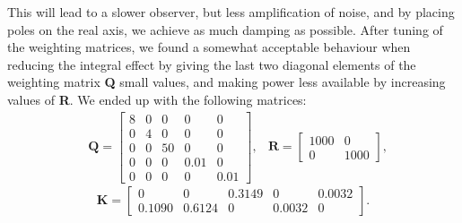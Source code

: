 This will lead to a slower observer, but less amplification of noise, and by placing poles on the real axis, we achieve as much damping as possible. After tuning of the weighting matrices, we found a somewhat acceptable behaviour when reducing the integral effect by giving the last two diagonal elements of the weighting matrix \textbf{Q} small values, and making power less available by increasing values of \textbf{R}. We ended up with the following matrices:
\begin{align}\nonumber
&\mathbf{Q} = 
\begin{bmatrix}
    8 & 0 & 0 & 0 & 0\\
    0 & 4 & 0 & 0 & 0\\
    0 & 0 & 50 & 0 & 0\\
    0 & 0 & 0 & 0.01 & 0\\
    0 & 0 & 0 & 0 & 0.01
\end{bmatrix},
&\mathbf{R} =
\begin{bmatrix}
    1000 & 0\\
    0 & 1000
\end{bmatrix},
\end{align}
\begin{equation}\nonumber
\mathbf{K} =
\begin{bmatrix}
    0 & 0 & 0.3149 & 0 & 0.0032\\
    0.1090 & 0.6124 & 0 & 0.0032 & 0
\end{bmatrix}.
\end{equation}